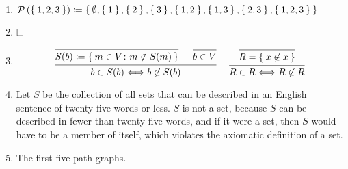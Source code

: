 \documentclass[nobib]{tufte-book}
\newcommand{\powerset}[1]{\mathcal{P}\left(#1\right)}
\begin{document}
\begin{enumerate}
\item $\powerset{\Set{1,2,3}} \coloneqq \Set{
  \emptyset,
  \Set{1},    \Set{2},   \Set{3},
  \Set{1,2},  \Set{1,3}, \Set{2,3},
  \Set{1,2,3}
}$

\item
  \begin{prooftree*}
  \end{prooftree*}
  $\hfill\square$

\item
  \[
    \begin{prooftree}
      \infer0{ S(b) \coloneqq \Set{ m \in V \colon m \not\in S(m) } }
      \infer0{ b \in V }
      \infer2{ b \in S(b) \Leftarrow\!\Rightarrow b \not\in S(b) }
    \end{prooftree}
    \equiv
    \begin{prooftree}
      \infer0{ R = \Set{ x \not\in x } }
      \infer1{ R \in R \Leftarrow\!\Rightarrow R \not\in R }
    \end{prooftree}
  \]

\item Let $S$ be the collection of all sets that can be described in an English
  sentence of twenty-five words or less. $S$ is not a set, because $S$ can be
  described in fewer than twenty-five words, and if it were a set, then $S$
  would have to be a member of itself, which violates the axiomatic definition
  of a set.

\item The first five \glspl{path graph}.
  \begin{figure*}
\end{figure*}
\end{enumerate}
\end{document}
